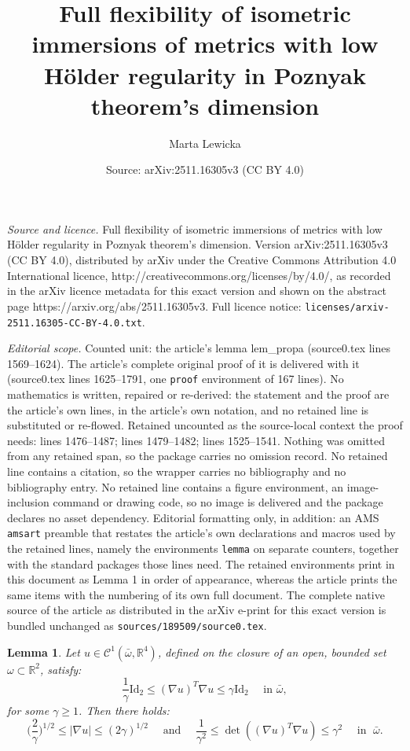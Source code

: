 \documentclass[10pt,a4paper]{amsart}
\title{Full flexibility of isometric immersions of metrics with low H\"older regularity in Poznyak theorem's dimension}
\author{Marta Lewicka}
\date{Source: arXiv:2511.16305v3 (CC BY 4.0)}
\newtheorem{lemma}{Lemma}
\newcommand{\Id}{\mathrm{Id}}
\newcommand{\R}{\mathbb{R}}
\begin{document}
\maketitle

\noindent\emph{Source and licence.} Full flexibility of isometric immersions of metrics with low H\"older regularity in Poznyak theorem's dimension. Version arXiv:2511.16305v3 (CC BY 4.0), distributed by arXiv under the Creative Commons Attribution 4.0 International licence, http://creativecommons.org/licenses/by/4.0/, as recorded in the arXiv licence metadata for this exact version and shown on the abstract page https://arxiv.org/abs/2511.16305v3. Full licence notice: \texttt{licenses/arxiv-2511.16305-CC-BY-4.0.txt}.\par\smallskip

\noindent\textit{Editorial scope.} Counted unit: the article's lemma lem\_propa (source0.tex lines 1569--1624). The article's complete original proof of it is delivered with it (source0.tex lines 1625--1791, one \texttt{proof} environment of 167 lines). No mathematics is written, repaired or re-derived: the statement and the proof are the article's own lines, in the article's own notation, and no retained line is substituted or re-flowed.  Retained uncounted as the source-local context the proof needs: lines 1476--1487; lines 1479--1482; lines 1525--1541.  Nothing was omitted from any retained span, so the package carries no omission record.  No retained line contains a citation, so the wrapper carries no bibliography and no bibliography entry.  No retained line contains a figure environment, an image-inclusion command or drawing code, so no image is delivered and the package declares no asset dependency.  Editorial formatting only, in addition: an AMS \texttt{amsart} preamble that restates the article's own declarations and macros used by the retained lines, namely the environments \texttt{lemma} on separate counters, together with the standard packages those lines need.  The retained environments print in this document as Lemma 1 in order of appearance, whereas the article prints the same items with the numbering of its own full document.  The complete native source of the article as distributed in the arXiv e-print for this exact version is bundled unchanged as \texttt{sources/189509/source0.tex}.
\begin{lemma}\label{lem_det}
Let $u\in\mathcal{C}^1(\bar\omega,\R^4)$, defined on the closure of an
open, bounded set $\omega\subset\R^2$, satisfy:
\begin{equation}\label{immers_gamma}
\frac{1}{\gamma}\Id_2\leq (\nabla u)^T\nabla u \leq \gamma\Id_2
\quad\mbox{ in } \bar\omega,
\end{equation}
 for some $\gamma\geq 1$. Then there holds:
$$\big(\frac{2}{\gamma}\big)^{1/2} \leq |\nabla u| \leq (2\gamma)^{1/2} \quad\mbox{ and }\quad 
\frac{1}{\gamma^2}\leq\det((\nabla u)^T\nabla u)\leq \gamma^2
\quad \mbox{ in } \;\bar\omega.$$
\end{lemma}
\end{document}
